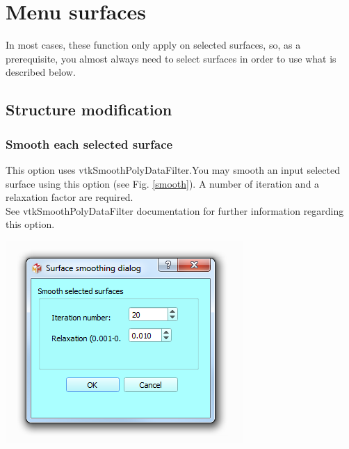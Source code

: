 
\chapter{Menu surfaces}
\minitoc 


In most cases, these function only apply on selected surfaces, so, as a prerequisite, you almost always need to select surfaces in order to use what is described below.



\section{Structure modification}
\subsection{Smooth each selected surface}
\noindent
\begin{minipage}{0.5\textwidth}
This option uses vtkSmoothPolyDataFilter.You may smooth an input
selected surface using this option (see Fig. \ref{smooth}). A number of iteration and a
relaxation factor are required.\\
See vtkSmoothPolyDataFilter documentation for further information regarding this option.
\end{minipage}    
\begin{minipage}{0.5\textwidth}\centering
  \includegraphics[scale=0.5]{images/09/structure/surface_smoothing_dialog.png}
 \end{minipage} 
\noindent

